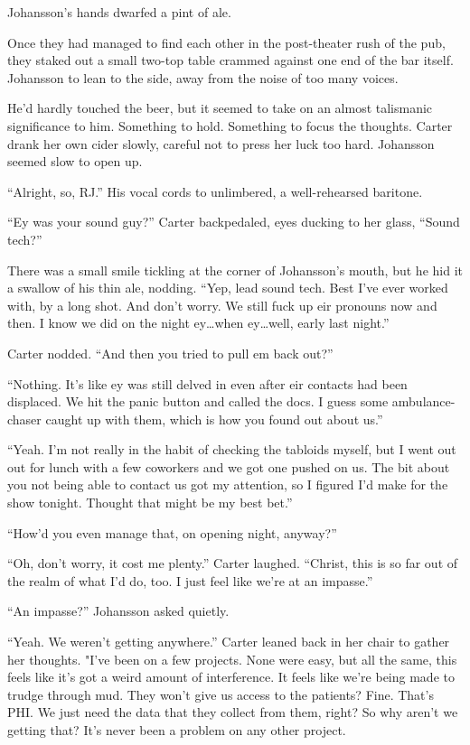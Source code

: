 Johansson's hands dwarfed a pint of ale.

Once they had managed to find each other in the post-theater rush of the pub, they staked out a small two-top table crammed against one end of the bar itself. Johansson to lean to the side, away from the noise of too many voices.

He'd hardly touched the beer, but it seemed to take on an almost talismanic significance to him. Something to hold. Something to focus the thoughts. Carter drank her own cider slowly, careful not to press her luck too hard. Johansson seemed slow to open up.

``Alright, so, RJ.'' His vocal cords to unlimbered, a well-rehearsed baritone.

``Ey was your sound guy?'' Carter backpedaled, eyes ducking to her glass, ``Sound tech?''

There was a small smile tickling at the corner of Johansson's mouth, but he hid it a swallow of his thin ale, nodding. ``Yep, lead sound tech. Best I've ever worked with, by a long shot. And don't worry. We still fuck up eir pronouns now and then. I know we did on the night ey\ldots{}when ey\ldots{}well, early last night.''

Carter nodded. ``And then you tried to pull em back out?''

``Nothing. It's like ey was still delved in even after eir contacts had been displaced. We hit the panic button and called the docs. I guess some ambulance-chaser caught up with them, which is how you found out about us.''

``Yeah. I'm not really in the habit of checking the tabloids myself, but I went out out for lunch with a few coworkers and we got one pushed on us. The bit about you not being able to contact us got my attention, so I figured I'd make for the show tonight. Thought that might be my best bet.''

``How'd you even manage that, on opening night, anyway?''

``Oh, don't worry, it cost me plenty.'' Carter laughed. ``Christ, this is so far out of the realm of what I'd do, too. I just feel like we're at an impasse.''

``An impasse?'' Johansson asked quietly.

``Yeah. We weren't getting anywhere.'' Carter leaned back in her chair to gather her thoughts. "I've been on a few projects. None were easy, but all the same, this feels like it's got a weird amount of interference. It feels like we're being made to trudge through mud. They won't give us access to the patients? Fine. That's PHI. We just need the data that they collect from them, right? So why aren't we getting that? It's never been a problem on any other project.

